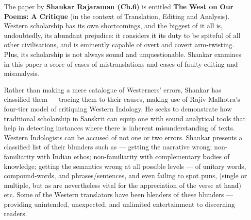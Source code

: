 The paper by {\bf Shankar Rajaraman (Ch.\@ 6)} is entitled {\bf The West on Our Poems: A Critique} (in the context of Translation, Editing and Analysis). Western scholarship has its own shortcomings, and the biggest of it all is, undoubtedly, its abundant prejudice: it considers it its duty to be spiteful of all other civilisations, and is eminently capable of overt and covert arm-twisting. Plus, its scholarship is not always sound and unquestionable. Shankar examines in this paper a score of cases of mistranslations and cases of faulty editing and misanalysis. 

Rather than making a mere catalogue of Westerners’ errors, Shankar has classified them --- tracing them to their causes, making use of Rajiv Malhotra’s four-tier model of critiquing Western Indology. He seeks to demonstrate how traditional scholarship in Sanskrit can equip one with sound analytical tools that help in detecting instances where there is inherent misunderstanding of texts. Western Indologists can be accused of not one or two errors. Shankar presents a classified list of their blunders such as --- getting the narrative wrong; \hbox{non-familiarity} with Indian ethos; non-familiarity with complementary bodies of knowledge; getting the semantics wrong at all possible levels --- of unitary words, compound-words, and phrases/sentences, and even failing to spot puns, (single or multiple, but as are nevertheless vital for the appreciation of the verse at hand) etc. Some of the Western translators have been blenders of these blunders --- providing unintended, unexpected, and unlimited entertainment to discerning readers. 

